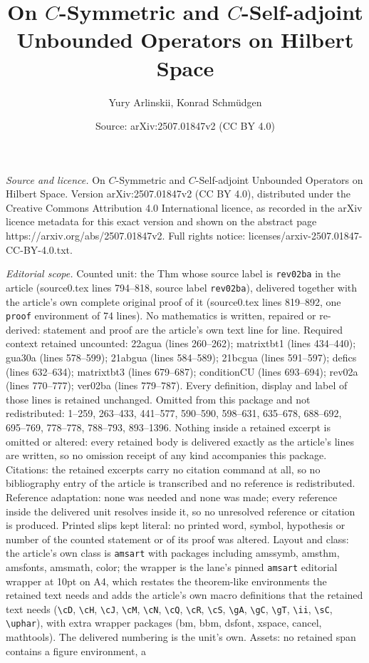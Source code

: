 \documentclass[10pt,a4paper]{amsart}
\title[On $C$-Symmetric and $C$-Self-adjoint Unbounded Operators on]{On $C$-Symmetric and $C$-Self-adjoint Unbounded Operators on Hilbert Space}
\author{Yury Arlinskii, Konrad Schm\"udgen}
\date{Source: arXiv:2507.01847v2 (CC BY 4.0)}
\begin{document}
\maketitle

\noindent\emph{Source and licence.} On $C$-Symmetric and $C$-Self-adjoint Unbounded Operators on Hilbert Space. Version arXiv:2507.01847v2 (CC BY 4.0), distributed under the Creative Commons Attribution 4.0 International licence, as recorded in the arXiv licence metadata for this exact version and shown on the abstract page https://arxiv.org/abs/2507.01847v2. Full rights notice: licenses/arxiv-2507.01847-CC-BY-4.0.txt.\par\smallskip

\noindent\textit{Editorial scope.} Counted unit: the Thm whose source label is \texttt{rev02ba} in the article (source0.tex lines 794--818, source label \texttt{rev02ba}), delivered together with the article's own complete original proof of it (source0.tex lines 819--892, one \texttt{proof} environment of 74 lines). No mathematics is written, repaired or re-derived: statement and proof are the article's own text line for line. Required context retained uncounted: 22agua (lines 260--262); matrixtbt1 (lines 434--440); gua30a (lines 578--599); 21abgua (lines 584--589); 21bcgua (lines 591--597); defics (lines 632--634); matrixtbt3 (lines 679--687); conditionCU (lines 693--694); rev02a (lines 770--777); ver02ba (lines 779--787). Every definition, display and label of those lines is retained unchanged. Omitted from this package and not redistributed: 1--259, 263--433, 441--577, 590--590, 598--631, 635--678, 688--692, 695--769, 778--778, 788--793, 893--1396. Nothing inside a retained excerpt is omitted or altered: every retained body is delivered exactly as the article's lines are written, so no omission receipt of any kind accompanies this package. Citations: the retained excerpts carry no citation command at all, so no bibliography entry of the article is transcribed and no reference is redistributed. Reference adaptation: none was needed and none was made; every reference inside the delivered unit resolves inside it, so no unresolved reference or citation is produced. Printed slips kept literal: no printed word, symbol, hypothesis or number of the counted statement or of its proof was altered. Layout and class: the article's own class is \texttt{amsart} with packages including amssymb, amsthm, amsfonts, amsmath, color; the wrapper is the lane's pinned \texttt{amsart} editorial wrapper at 10pt on A4, which restates the theorem-like environments the retained text needs and adds the article's own macro definitions that the retained text needs (\texttt{\textbackslash cD}, \texttt{\textbackslash cH}, \texttt{\textbackslash cJ}, \texttt{\textbackslash cM}, \texttt{\textbackslash cN}, \texttt{\textbackslash cQ}, \texttt{\textbackslash cR}, \texttt{\textbackslash cS}, \texttt{\textbackslash gA}, \texttt{\textbackslash gC}, \texttt{\textbackslash gT}, \texttt{\textbackslash ii}, \texttt{\textbackslash sC}, \texttt{\textbackslash uphar}), with extra wrapper packages (bm, bbm, dsfont, xspace, cancel, mathtools). The delivered numbering is the unit's own. Assets: no retained span contains a figure environment, a 
\end{document}

